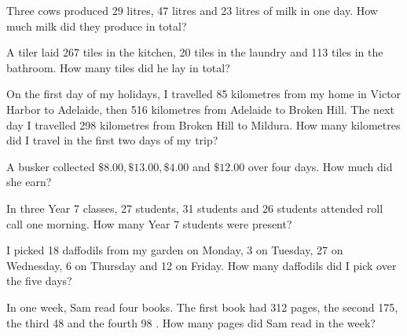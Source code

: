 \begin{exercises}
\begin{questions}
\begin{multicols}{2}
        \end{multicols}
        \Question[2] Three cows produced 29 litres, 47 litres and 23 litres of milk in one day. How much milk did they produce in total?
        \begin{solutionordottedlines}[1in]
        \end{solutionordottedlines}
        \Question[2] A tiler laid 267 tiles in the kitchen, 20 tiles in the laundry and 113 tiles in the bathroom. How many tiles did he lay in total?
        \begin{solutionordottedlines}[1in]
        \end{solutionordottedlines}
        \Question[2] On the first day of my holidays, I travelled 85 kilometres from my home in Victor Harbor to Adelaide, then 516 kilometres from Adelaide to Broken Hill. The next day I travelled 298 kilometres from Broken Hill to Mildura.
How many kilometres did I travel in the first two days of my trip?
        \begin{solutionordottedlines}[2in]
        \end{solutionordottedlines}
        \Question[2] A busker collected \(\$ 8.00, \$ 13.00, \$ 4.00\) and \(\$ 12.00\) over four days. How much did she earn?
        \begin{solutionordottedlines}[2in]
        \end{solutionordottedlines}
        \Question[2] In three Year 7 classes, 27 students, 31 students and 26 students attended roll call one morning. How many Year 7 students were present?
        \begin{solutionordottedlines}[2in]
        \end{solutionordottedlines}
        \Question[2] I picked 18 daffodils from my garden on Monday, 3 on Tuesday, 27 on Wednesday, 6 on Thursday and 12 on Friday. How many daffodils did I pick over the five days?
        \begin{solutionordottedlines}[2in]
        \end{solutionordottedlines}
        \Question[2] In one week, Sam read four books. The first book had 312 pages, the second 175, the third 48 and the fourth 98 . How many pages did Sam read in the week?
        \begin{solutionordottedlines}[2in]
        \end{solutionordottedlines}
        \Question[2]$\,$
        \begin{parts}

\end{parts}
\end{questions}
\end{exercises}
